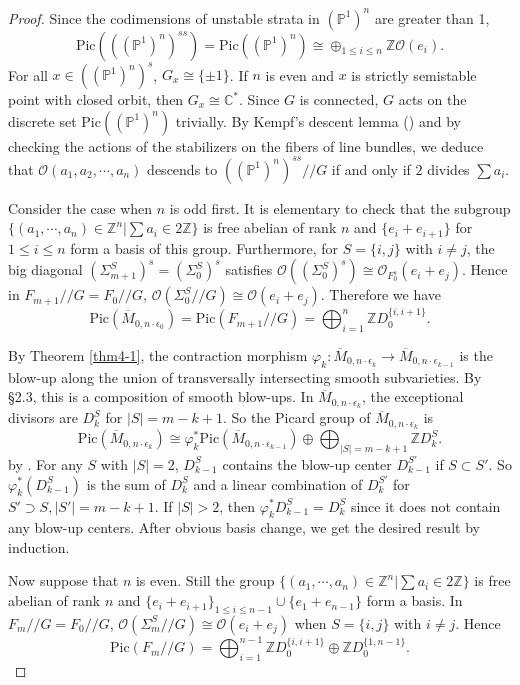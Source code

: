 \documentclass[10pt]{amsart}
\theoremstyle{definition}
\newcommand{\PP}{\mathbb{P}}
\newcommand{\CC}{\mathbb{C}}
\newcommand{\ZZ}{\mathbb{Z}}
\newcommand{\cO}{\mathcal{O} }
\def\Mzez{\overline{M}_{0,n\cdot \epsilon_0} }
\def\Mzek{\overline{M}_{0,n\cdot \epsilon_k} }
\def\Mzeko{\overline{M}_{0,n\cdot \epsilon_{k-1}} }
\def\git{/\!/ }
\begin{document}
\begin{proof}
Since the codimensions of unstable strata in $(\PP^1)^n$ are greater
than 1, $$\mathrm{Pic} (((\PP^1)^n)^{ss}) = \mathrm{Pic} ((\PP^1)^n)
\cong \oplus_{1 \le i \le n} \ZZ \cO(e_i).$$ For all $x \in
((\PP^1)^n)^s$, $G_x \cong \{\pm 1\}$. If $n$ is even and $x$ is
strictly semistable point with closed orbit, then $G_x \cong \CC^*$.
Since $G$ is connected, $G$ acts on the discrete set
$\mathrm{Pic}((\PP^1)^n)$ trivially. By Kempf's descent lemma
(\cite[theorem 2.3]{DN}) and by checking the actions of the
stabilizers on the fibers of line bundles, we deduce that $\cO(a_1,
a_2, \cdots, a_n)$ descends to $((\PP^1)^n)^{ss} \git G$ if and only
if $2$ divides $\sum a_i$.

Consider the case when $n$ is odd first. It is elementary to check
that the subgroup $\{(a_1, \cdots, a_n) \in \ZZ^n | \sum a_i \in
2\ZZ \}$ is free abelian of rank $n$ and $\{e_i + e_{i+1}\}$ for
$1 \le i \le n$ form a basis of this group. Furthermore, for
$S=\{i,j\}$ with $i\ne j$, the big diagonal $(\Sigma_{m+1}^S)^s =
(\Sigma_0^S)^s$ satisfies $\cO((\Sigma_0^S)^s) \cong
\cO_{F_0^s}(e_i+e_j)$. Hence in $F_{m+1}\git G = F_0 \git G$,
$\cO(\Sigma_0^S \git G) \cong \cO(e_i + e_j)$. Therefore we have
\[
    \mathrm{Pic} (\Mzez) = \mathrm{Pic} (F_{m+1} \git G)
    = \bigoplus_{i = 1}^n \ZZ D_0^{\{i, i+1\}}.
\]

By Theorem \ref{thm4-1}, the contraction morphism $\varphi_k :
\Mzek \to \Mzeko$ is the blow-up along the union of transversally
intersecting smooth subvarieties. By \S2.3, this is a composition
of smooth blow-ups. In $\Mzek$, the exceptional divisors are
$D^S_k$ for $|S| = {m-k+1}$. So the Picard group of $\Mzek$ is
\[
    \mathrm{Pic} (\Mzek) \cong \varphi_k^* \mathrm{Pic} (\Mzeko) \oplus
    \bigoplus_{|S| = {m-k+1}}\ZZ D^S_k.
\]
by \cite[II Exe. 8.5]{Hartshorne}. For any $S$ with $|S| = 2$,
$D_{k-1}^S$ contains the blow-up center $D_{k-1}^{S'}$ if $S
\subset {S'}$. So $\varphi_k^* (D_{k-1}^S)$ is the sum of $D_k^S$
and a linear combination of $D_k^{S'}$ for $S' \supset S, |S'| =
m-k+1$. If $|S| > 2$, then $\varphi_k^* D^S_{k-1} = D^S_k$ since
it does not contain any blow-up centers. After obvious basis
change, we get the desired result by induction.

Now suppose that $n$ is even. Still the group $\{ (a_1, \cdots,
a_n) \in \ZZ^n | \sum a_i \in 2\ZZ\}$ is free abelian of rank $n$
and $\{e_i + e_{i+1}\}_{1 \le i \le n-1} \cup \{e_1 + e_{n-1}\}$
form a basis. In $F_m\git G = F_0 \git G$, $\cO(\Sigma_m^S\git G)
\cong \cO(e_i + e_j)$ when $S = \{i, j\}$ with $i\ne j$. Hence
\[
    \mathrm{Pic} (F_m \git G) = \bigoplus_{i=1}^{n-1}
    \ZZ D_0^{\{i, i+1\}} \oplus \ZZ D_0^{\{1, n-1\}}.
\]


\end{proof}
\end{document}
